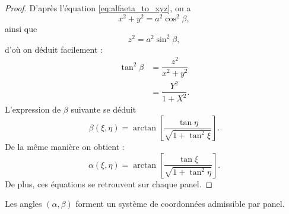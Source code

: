 \begin{proof}
D'après l'équation \eqref{eq:alfaeta_to_xyz}, on a
\begin{equation}
x^2 + y^2 = a^2 \cos^2 \beta,
\end{equation}
ainsi que
\begin{equation}
z^2 = a^2 \sin^2 \beta,
\end{equation}
d'où on déduit facilement :
\begin{align*}
\tan^2 \beta & = \dfrac{z^2}{x^2+y^2} \\
	& = \dfrac{Y^2}{1+X^2}.
\end{align*}
L'expression de $\beta$ suivante se déduit
\begin{equation}
\beta(\xi, \eta) = \arctan \left[ \dfrac{\tan \eta}{\sqrt{1+\tan^2 \xi}} \right].
\end{equation}
De la même manière on obtient :
\begin{equation}
\alpha(\xi, \eta) = \arctan \left[ \dfrac{\tan \xi}{\sqrt{1+\tan^2 \eta}} \right].
\end{equation}
De plus, ces équations se retrouvent sur chaque panel.
\end{proof}


\begin{theoreme}
Les angles $(\alpha, \beta)$ forment un système de coordonnées admissible par panel.
\end{theoreme}

